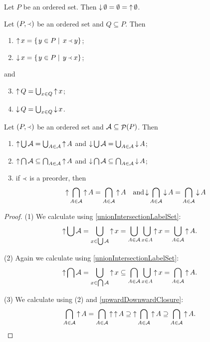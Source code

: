 \begin{lemma}
Let $P$ be an ordered set. Then $\mathop{\downarrow}\emptyset = \emptyset = \mathop{\uparrow}\emptyset$.
\end{lemma}

\begin{lemma}
Let $\left( P, \Yleft \right)$ be an ordered set and $Q\subseteq P$. Then
\begin{enumerate}
\item $\mathop{\uparrow} x = \left\{\left. y\in P \;\right|\; x\Yleft y \right\}$;
\item $\mathop{\downarrow} x = \left\{\left. y\in P \;\right|\; y\Yleft x \right\}$;
\end{enumerate}
and
\begin{enumerate} \setcounter{enumi}{2}
\item $\mathop{\uparrow} Q = \bigcup_{x\in Q} \mathop{\uparrow} x$;
\item $\mathop{\downarrow} Q = \bigcup_{x\in Q} \mathop{\downarrow} x$.
\end{enumerate}
\end{lemma}
\begin{corollary} \label{upDownsetUnionIntersection}
Let $\left( P,\Yleft \right)$ be an ordered set and $\mathcal{A}\subseteq \mathop{\mathcal{P}}(P)$. Then
\begin{enumerate}
\item $\mathop{\uparrow} \bigcup \mathcal{A} = \bigcup_{A\in \mathcal{A}} \mathop{\uparrow} A$ and $\mathop{\downarrow} \bigcup \mathcal{A} = \bigcup_{A\in \mathcal{A}} \mathop{\downarrow} A$;
\item $\mathop{\uparrow} \bigcap \mathcal{A} \subseteq \bigcap_{A\in \mathcal{A}} \mathop{\uparrow} A$ and $\mathop{\downarrow} \bigcap \mathcal{A} \subseteq \bigcap_{A\in \mathcal{A}} \mathop{\downarrow} A$;
\item if $\Yleft$ is a preorder, then
\[ \mathop{\uparrow} \bigcap_{A\in \mathcal{A}} \mathop{\uparrow} A = \bigcap_{A\in \mathcal{A}} \mathop{\uparrow} A \quad\text{and} \mathop{\downarrow} \bigcap_{A\in \mathcal{A}} \mathop{\downarrow} A = \bigcap_{A\in \mathcal{A}} \mathop{\downarrow} A \]
\end{enumerate}
\end{corollary}
\begin{proof}
(1) We calculate using \ref{unionIntersectionLabelSet}:
\[ \mathop{\uparrow} \bigcup \mathcal{A} = \bigcup_{x\in \bigcup\mathcal{A}} \mathop{\uparrow} x = \bigcup_{A\in \mathcal{A}}\bigcup_{x\in A}\mathop{\uparrow} x = \bigcup_{A\in \mathcal{A}} \mathop{\uparrow} A. \]

(2) Again we calculate using \ref{unionIntersectionLabelSet}:
\[ \mathop{\uparrow} \bigcap \mathcal{A} = \bigcup_{x\in \bigcap\mathcal{A}} \mathop{\uparrow} x \subseteq \bigcap_{A\in \mathcal{A}}\bigcup_{x\in A}\mathop{\uparrow} x = \bigcap_{A\in \mathcal{A}} \mathop{\uparrow} A. \]

(3) We calculate using (2) and \ref{upwardDownwardClosure}:
\[ \bigcap_{A\in \mathcal{A}} \mathop{\uparrow} A = \bigcap_{A\in \mathcal{A}} \mathop{\uparrow}\mathop{\uparrow} A \supseteq \mathop{\uparrow} \bigcap_{A\in \mathcal{A}} \mathop{\uparrow} A \supseteq \bigcap_{A\in \mathcal{A}} \mathop{\uparrow} A. \]
\end{proof}
